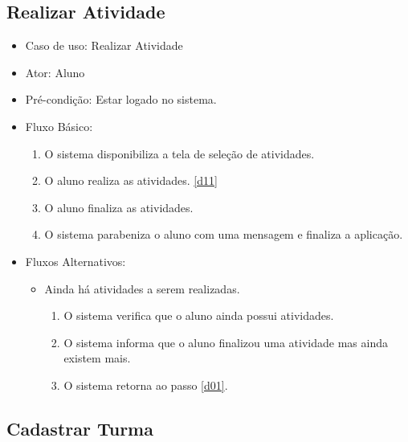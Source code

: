 \documentclass{utfpr-pg}
\begin{document}
    
    \subsection{Realizar Atividade}
    
    \begin{itemize}
        \item Caso de uso: Realizar Atividade
        \item Ator: Aluno
        \item Pré-condição: Estar logado no sistema.
        \item Fluxo Básico:
        \begin{enumerate}[label=\textbf{\arabic*}]
            \item \label{d01} O sistema disponibiliza a tela de seleção de atividades.
            \item O aluno realiza as atividades. \ref{d11}
            \item O aluno finaliza as atividades.
            \item O sistema parabeniza o aluno com uma mensagem e finaliza a aplicação.
            
        \end{enumerate}
        
        \item Fluxos Alternativos:
        \begin{itemize}
            \item Ainda há atividades a serem realizadas.
            \begin{enumerate}[label=\textbf{2.\arabic*}]
                \item \label{d11} O sistema verifica que o aluno ainda possui atividades.
                \item O sistema informa que o aluno finalizou uma atividade mas ainda existem mais.
                \item O sistema retorna ao passo \ref{d01}.
            \end{enumerate}
            
        \end{itemize}
        
    \end{itemize}
    
    \subsection{Cadastrar Turma}
    
\end{document}
